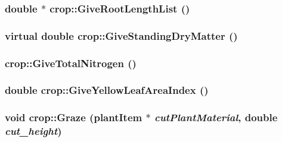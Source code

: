 \label{classcrop_a45017219012e2e4865e53c406ca32756}
\hypertarget{classcrop_a17c3bc93f8a3a6c784f9e30e9d17fbef}{
\subsubsection[{GiveRootLengthList}]{\setlength{\rightskip}{0pt plus 5cm}double $\ast$ crop::GiveRootLengthList ()}}
\label{classcrop_a17c3bc93f8a3a6c784f9e30e9d17fbef}
\hypertarget{classcrop_aebb32418775393941f24b066cd4ddec9}{
\subsubsection[{GiveStandingDryMatter}]{\setlength{\rightskip}{0pt plus 5cm}virtual double crop::GiveStandingDryMatter ()}}
\label{classcrop_aebb32418775393941f24b066cd4ddec9}
\hypertarget{classcrop_a0d276aec35091a517cc117546cf8c9f9}{
\subsubsection[{GiveTotalNitrogen}]{ crop::GiveTotalNitrogen ()}}
\label{classcrop_a0d276aec35091a517cc117546cf8c9f9}
\hypertarget{classcrop_a86c3888357b5ca286bfaede7fa64c1e4}{
\subsubsection[{GiveYellowLeafAreaIndex}]{\setlength{\rightskip}{0pt plus 5cm}double crop::GiveYellowLeafAreaIndex ()}}
\label{classcrop_a86c3888357b5ca286bfaede7fa64c1e4}
\hypertarget{classcrop_a4acf198494d9c34cf42f27e5a9f11032}{
\subsubsection[{Graze}]{\setlength{\rightskip}{0pt plus 5cm}void crop::Graze ({\bf plantItem} $\ast$ {\em cutPlantMaterial}, \/  double {\em cut\_\-height})}}
